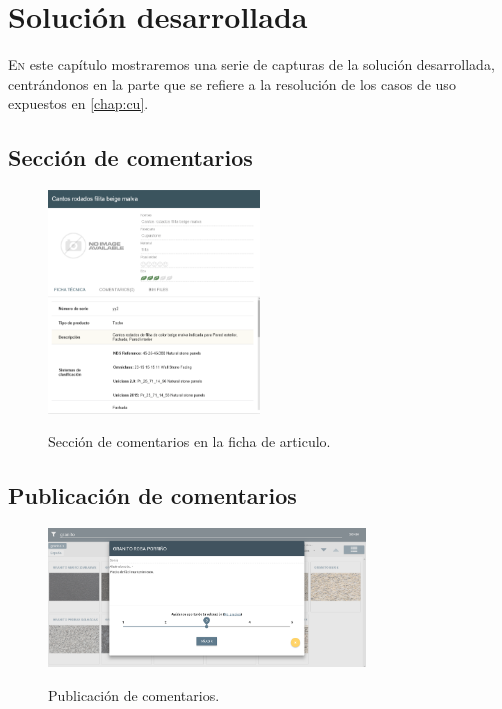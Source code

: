 \chapter{Solución desarrollada}

\lettrine{E}{n} este capítulo mostraremos una serie de capturas de la solución desarrollada, centrándonos en la parte que se refiere a la resolución de los casos de uso expuestos en \ref{chap:cu}.

\section{Sección de comentarios}

\begin{figure}[H]
	\centering
	\includegraphics[width=0.5\textwidth]{imaxes/sectComment.png}
	\label{seccom}
	\caption{Sección de comentarios en la ficha de articulo.}
\end{figure}


\section{Publicación de comentarios}

\begin{figure}[H]
	\centering
	\includegraphics[width=0.75\textwidth]{imaxes/publicComment.png}
	\label{pubcom}
	\caption{Publicación de comentarios.}
\end{figure}

